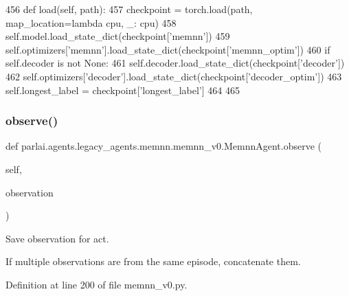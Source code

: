 \begin{DoxyCode}
456     \textcolor{keyword}{def }load(self, path):
457         checkpoint = torch.load(path, map\_location=\textcolor{keyword}{lambda} cpu, \_: cpu)
458         self.model.load\_state\_dict(checkpoint[\textcolor{stringliteral}{'memnn'}])
459         self.optimizers[\textcolor{stringliteral}{'memnn'}].load\_state\_dict(checkpoint[\textcolor{stringliteral}{'memnn\_optim'}])
460         \textcolor{keywordflow}{if} self.decoder \textcolor{keywordflow}{is} \textcolor{keywordflow}{not} \textcolor{keywordtype}{None}:
461             self.decoder.load\_state\_dict(checkpoint[\textcolor{stringliteral}{'decoder'}])
462             self.optimizers[\textcolor{stringliteral}{'decoder'}].load\_state\_dict(checkpoint[\textcolor{stringliteral}{'decoder\_optim'}])
463             self.longest\_label = checkpoint[\textcolor{stringliteral}{'longest\_label'}]
464 
465 
\end{DoxyCode}
\mbox{\label{classparlai_1_1agents_1_1legacy__agents_1_1memnn_1_1memnn__v0_1_1MemnnAgent_a0f8358dd299ba6719f7354771938fd7b}} 
\subsubsection{\texorpdfstring{observe()}{observe()}}
{\footnotesize\ttfamily def parlai.\+agents.\+legacy\+\_\+agents.\+memnn.\+memnn\+\_\+v0.\+Memnn\+Agent.\+observe (\begin{DoxyParamCaption}\item[{}]{self,  }\item[{}]{observation }\end{DoxyParamCaption})}

\begin{DoxyVerb}Save observation for act.

If multiple observations are from the same episode, concatenate them.
\end{DoxyVerb}
 

Definition at line 200 of file memnn\+\_\+v0.\+py.


